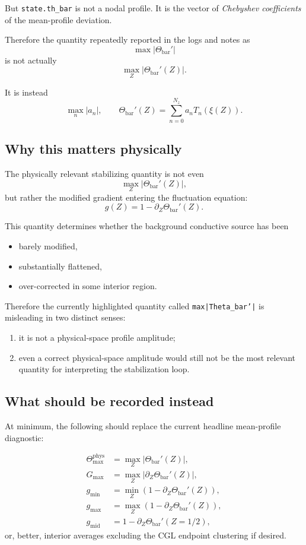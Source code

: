 \documentclass[11pt]{article}
\begin{document}
But \texttt{state.th\_bar} is not a nodal profile. It is the vector of \emph{Chebyshev coefficients} of the mean-profile deviation.

Therefore the quantity repeatedly reported in the logs and notes as
\[
\max|\Theta_{\mathrm{bar}}'|
\]
is not actually
\[
\max_Z |\Theta_{\mathrm{bar}}'(Z)|.
\]

It is instead
\[
\max_n |a_n|,
\qquad
\Theta_{\mathrm{bar}}'(Z)
=
\sum_{n=0}^{N_z} a_n T_n(\xi(Z)).
\]

\subsection{Why this matters physically}

The physically relevant stabilizing quantity is not even
\[
\max_Z |\Theta_{\mathrm{bar}}'(Z)|,
\]
but rather the modified gradient entering the fluctuation equation:
\[
g(Z)
=
1-\partial_Z\Theta_{\mathrm{bar}}'(Z).
\]

This quantity determines whether the background conductive source has been

\begin{itemize}
\item barely modified,
\item substantially flattened,
\item over-corrected in some interior region.
\end{itemize}

Therefore the currently highlighted quantity called \texttt{max|Theta\_bar'|} is misleading in two distinct senses:

\begin{enumerate}
\item it is not a physical-space profile amplitude;
\item even a correct physical-space amplitude would still not be the most relevant quantity for interpreting the stabilization loop.
\end{enumerate}

\subsection{What should be recorded instead}

At minimum, the following should replace the current headline mean-profile diagnostic:

\begin{align*}
\Theta_{\max}^{\mathrm{phys}}
&=
\max_Z |\Theta_{\mathrm{bar}}'(Z)|, \\
G_{\max}
&=
\max_Z |\partial_Z \Theta_{\mathrm{bar}}'(Z)|, \\
g_{\min}
&=
\min_Z \left(1-\partial_Z\Theta_{\mathrm{bar}}'(Z)\right), \\
g_{\max}
&=
\max_Z \left(1-\partial_Z\Theta_{\mathrm{bar}}'(Z)\right), \\
g_{\mathrm{mid}}
&=
1-\partial_Z\Theta_{\mathrm{bar}}'(Z=1/2),
\end{align*}
or, better, interior averages excluding the CGL endpoint clustering if desired.
\end{document}
